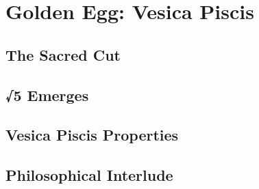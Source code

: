 \chapter{Golden Egg: Vesica Piscis}
\section{The Sacred Cut}
\section{√5 Emerges}
\section{Vesica Piscis Properties}
\section{Philosophical Interlude}

